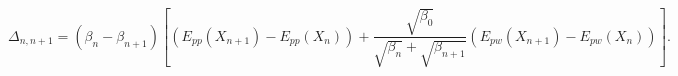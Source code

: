\begin{center}
    \begin{equation}
        \Delta_{n,n+1} = (\beta_{n} - \beta_{n+1})[(E_{pp}(X_{n+1}) - E_{pp}(X_{n})) + \frac{\sqrt{\beta_{0}}}{\sqrt{\beta_{n}}+\sqrt{\beta_{n+1}}}(E_{pw}(X_{n+1}) - E_{pw}(X_{n}))].
        \label{eq:rest2_AR}
    \end{equation}
\end{center}